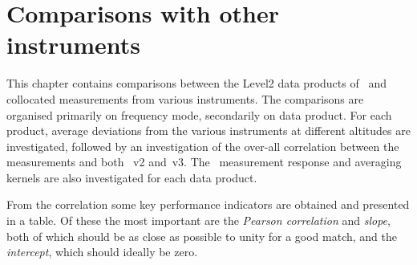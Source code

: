 \chapter{Comparisons with other instruments}
\label{chapter:comparisons}
This chapter contains comparisons between the Level2 data products of \smr\ and
collocated measurements from various instruments. The comparisons are organised
primarily on frequency mode, secondarily on data product. For each product,
average deviations from the various instruments at different altitudes are
investigated, followed by an investigation of the over-all correlation between
the measurements and both \smr~v2 and~v3. The \smr\ measurement response and
averaging kernels are also investigated for each data product.

From the correlation some key performance indicators are obtained and presented
in a table. Of these the most important are the \emph{Pearson correlation} and
\emph{slope}, both of which should be as close as possible to unity for a good
match, and the \emph{intercept}, which should ideally be zero.
